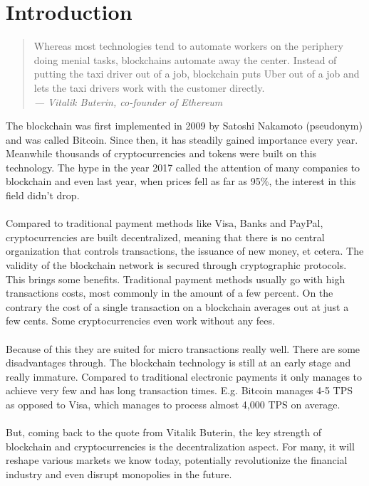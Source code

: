 \section{Introduction}
\begin{quote}
  Whereas most technologies tend to automate workers on the periphery doing menial tasks, blockchains automate away the center. Instead of putting the taxi driver out of a job, blockchain puts Uber out of a job and lets the taxi drivers work with the customer directly.
  \\
  {\textit{— Vitalik Buterin, co-founder of Ethereum}}
\end{quote}

The blockchain was first implemented in 2009 by Satoshi Nakamoto (pseudonym) and was called Bitcoin. Since then, it has steadily gained importance every year. Meanwhile thousands of cryptocurrencies and tokens were built on this technology. The hype in the year 2017 called the attention of many companies to blockchain and even last year, when prices fell as far as 95\%, the interest in this field didn't drop.
\\\\
Compared to traditional payment methods like Visa, Banks and PayPal, cryptocurrencies are built decentralized, meaning that there is no central organization that controls transactions, the issuance of new money, et cetera. The validity of the blockchain  network is secured through cryptographic protocols. This brings some benefits. Traditional payment methods usually go with high transactions costs, most commonly in the amount of a few percent. On the contrary the cost of a single transaction on a blockchain averages out at just a few cents\cite{ethereum-fee}. Some cryptocurrencies even work without any fees.
\\\\
Because of this they are suited for micro transactions really well. There are some disadvantages through. The blockchain technology is still at an early stage and really immature. Compared to traditional electronic payments it only manages to achieve very few  and has long transaction times. E.g. Bitcoin manages 4-5 TPS\cite{bitcoinTPS} as opposed to Visa, which manages to process almost 4,000 TPS on average\cite{visa}.
\\\\
But, coming back to the quote from Vitalik Buterin, the key strength of blockchain and cryptocurrencies is the decentralization aspect. For many, it will reshape various markets we know today, potentially revolutionize the financial industry and even disrupt monopolies in the future.
